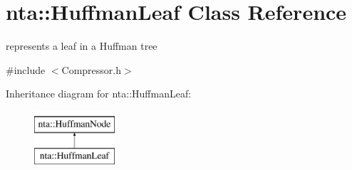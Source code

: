 \hypertarget{classnta_1_1HuffmanLeaf}{}\section{nta\+:\+:Huffman\+Leaf Class Reference}
\label{classnta_1_1HuffmanLeaf}


represents a leaf in a Huffman tree  




{\ttfamily \#include $<$Compressor.\+h$>$}

Inheritance diagram for nta\+:\+:Huffman\+Leaf\+:\begin{figure}[H]
\begin{center}
\leavevmode
\includegraphics[height=2.000000cm]{d0/d39/classnta_1_1HuffmanLeaf}
\end{center}
\end{figure}
